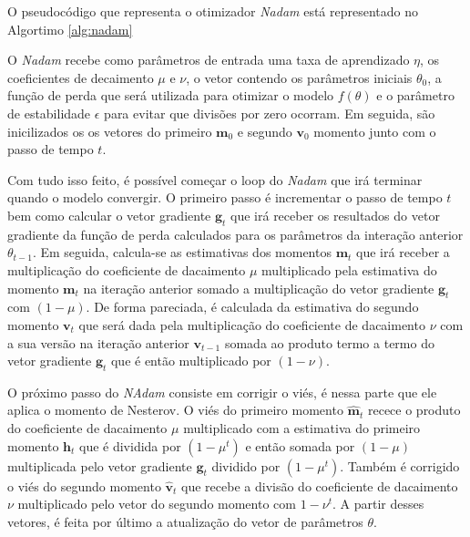 O pseudocódigo que representa o otimizador \textit{Nadam} está representado no Algortimo \ref{alg:nadam}

O \textit{Nadam} recebe como parâmetros de entrada uma taxa de aprendizado $\eta$, os coeficientes de decaimento $\mu$ e $\nu$, o vetor contendo os parâmetros iniciais $\theta_0$, a função de perda que será utilizada para otimizar o modelo $f(\theta)$ e o parâmetro de estabilidade $\epsilon$ para evitar que divisões por zero ocorram. Em seguida, são inicilizados os os vetores do primeiro $\mathbf{m}_0$ e segundo $\mathbf{v}_0$ momento junto com o passo de tempo $t$.

Com tudo isso feito, é possível começar o loop do \textit{Nadam} que irá terminar quando o modelo convergir. O primeiro passo é incrementar o passo de tempo $t$ bem como calcular o vetor gradiente $\mathbf{g}_t$ que irá receber os resultados do vetor gradiente da função de perda calculados para os parâmetros da interação anterior $\theta_{t-1}$. Em seguida, calcula-se as estimativas dos momentos $\mathbf{m}_t$ que irá receber a multiplicação do coeficiente de dacaimento $\mu$ multiplicado pela estimativa do momento $\mathbf{m}_t$ na iteração anterior somado a multiplicação do vetor gradiente $\mathbf{g}_t$ com $(1 - \mu)$. De forma pareciada, é calculada da estimativa do segundo momento $\mathbf{v}_t$ que será dada pela multiplicação do coeficiente de dacaimento $\nu$ com a sua versão na iteração anterior $\mathbf{v}_{t-1}$ somada ao produto termo a termo do vetor gradiente $\mathbf{g}_t$ que é então multiplicado por $(1 - \nu)$.

O próximo passo do \textit{NAdam} consiste em corrigir o viés, é nessa parte que ele aplica o momento de Nesterov. O viés do primeiro momento $\mathbf{\hat{m}}_t$ recece o produto do coeficiente de dacaimento $\mu$ multiplicado com a estimativa do primeiro momento $\mathbf{h}_t$ que é dividida por $(1 - \mu^t)$ e então somada por $(1 - \mu)$ multiplicada pelo vetor gradiente $\mathbf{g}_t$ dividido por $(1 - \mu^t)$. Também é corrigido o viés do segundo momento $\mathbf{\hat{v}}_t$ que recebe a divisão do coeficiente de dacaimento $\nu$ multiplicado pelo vetor do segundo momento com $1 - \nu^t$. A partir desses vetores, é feita por último a atualização do vetor de parâmetros $\theta$.


